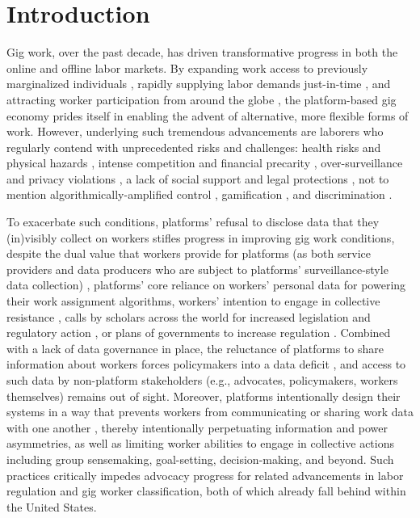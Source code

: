 \chapter{Introduction}\label{ch:introduction}
Gig work, over the past decade, has driven transformative progress in both the online and offline labor markets. 
By expanding work access to previously marginalized individuals \cite{moving, disabled}, rapidly supplying labor demands just-in-time \cite{jit, making}, and attracting worker participation from around the globe \cite{woborders}, the platform-based gig economy prides itself in enabling the advent of alternative, more flexible forms of work. 
However, underlying such tremendous advancements are laborers who regularly contend with unprecedented risks and challenges: health risks and physical hazards \cite{body, health, technostress, protective}, intense competition and financial precarity \cite{dark, precarity, france, km}, over-surveillance and privacy violations \cite{surveillance, privacy}, a lack of social support and legal protections \cite{atom, category, employment}, not to mention algorithmically-amplified control \cite{locus, good}, gamification \cite{game, ludification}, and discrimination \cite{Leung2020-rk, Gelles-Watnick2021-fz, Rosenblat2017-bm}.

To exacerbate such conditions, platforms' refusal to disclose data that they (in)visibly collect on workers stifles progress in improving gig work conditions, despite the dual value that workers provide for platforms (as both service providers and data producers who are subject to platforms' surveillance-style data collection) \cite{dual}, platforms' core reliance on workers' personal data for powering their work assignment algorithms, workers' intention to engage in collective resistance \cite{boss}, calls by scholars across the world for increased legislation and regulatory action \cite{regulate, organizing}, or plans of governments to increase regulation \cite{deficit}. Combined with a lack of data governance in place, the reluctance of platforms to share information about workers forces policymakers into a data deficit \cite{deficit}, and access to such data by non-platform stakeholders (e.g., advocates, policymakers, workers themselves) remains out of sight. Moreover, platforms intentionally design their systems in a way that prevents workers from communicating or sharing work data with one another \cite{uuapp}, thereby intentionally perpetuating information and power asymmetries, as well as limiting worker abilities to engage in collective actions including group sensemaking, goal-setting, decision-making, and beyond. Such practices critically impedes advocacy progress for related advancements in labor regulation and gig worker classification, both of which already fall behind within the United States.

